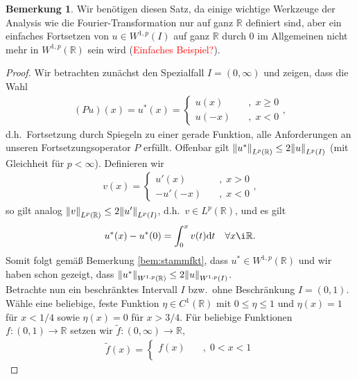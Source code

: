 \documentclass[twoside]{article}
\theoremstyle{definition}
\newtheorem{remark}[theorem]{Bemerkung}
\begin{document}
\begin{remark}
Wir benötigen diesen Satz, da einige wichtige Werkzeuge der Analysis wie die Fourier-Transformation nur auf ganz $\mathbb{R}$ definiert sind, aber ein einfaches Fortsetzen von $u \in W^{1,p}(I)$ auf ganz $\mathbb{R}$ durch $0$ im Allgemeinen nicht mehr in $W^{1,p}(\mathbb{R})$ sein wird (\textcolor{red}{Einfaches Beispiel?}).
\end{remark}
\begin{proof}
Wir betrachten zunächst den Spezialfall $I=(0,\infty)$ und zeigen, dass die Wahl
\begin{align*}
(Pu)(x) = u^*(x) = \begin{cases}
u(x) \quad &, \; x \geq 0\\
u(-x) \quad &, \; x < 0
\end{cases},
\end{align*}
d.h.\ Fortsetzung durch Spiegeln zu einer gerade Funktion, alle Anforderungen an unseren Fortsetzungsoperator $P$ erfüllt. Offenbar gilt $\norm{u^*}_{L^p(\mathbb{R})} \leq 2\norm{u}_{L^p(I)}$ (mit Gleichheit für $p < \infty$). Definieren wir
\begin{align*}
v(x) = \begin{cases}
u'(x) \quad &, \; x > 0\\
-u'(-x) \quad &, \; x < 0
\end{cases},
\end{align*}
so gilt analog $\norm{v}_{L^p(\mathbb{R})} \leq 2\norm{u'}_{L^p(I)}$, d.h.\ $v \in L^p(\mathbb{R})$, und es gilt
\begin{align*}
u^*(x)-u^*(0) = \int_0^x v(t) \mathrm{d}t \quad \forall x \i \mathbb{R}.
\end{align*}
Somit folgt gemäß Bemerkung \ref{bem:stammfkt}, dass $u^* \in W^{1,p}(\mathbb{R})$ und wir haben schon gezeigt, dass $\norm{u^*}_{W^{1,p}(\mathbb{R})} \leq 2 \norm{u}_{W^{1,p}(I)}$.\\
Betrachte nun ein beschränktes Intervall $I$ bzw.\ ohne Beschränkung $I = (0,1)$. Wähle eine beliebige, feste Funktion $\eta \in C^1(\mathbb{R})$ mit $0 \leq \eta \leq 1$ und $\eta(x) = 1$ für $x < 1/4$ sowie $\eta(x) = 0$ für $x > 3/4$. Für beliebige Funktionen $f :(0,1) \to \mathbb{R}$ setzen wir $\tilde{f}:(0,\infty)\to \mathbb{R}$,
\begin{align*}
\tilde{f}(x) = \begin{cases}
f(x) \quad &, \; 0<x<1\\

\end{cases}
\end{align*}
\end{proof}
\end{document}
